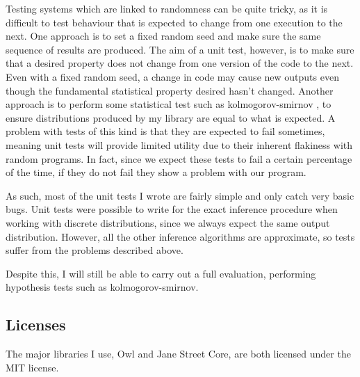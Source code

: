 Testing systems which are linked to randomness can be quite tricky, as it is difficult to test behaviour that is expected to change from one execution to the next. One approach is to set a fixed random seed and make sure the same sequence of results are produced. The aim of a unit test, however, is to make sure that a desired property does not change from one version of the code to the next. Even with a fixed random seed, a change in code may cause new outputs even though the fundamental statistical property desired hasn't changed. Another approach is to perform some statistical test such as kolmogorov-smirnov \cite{}, to ensure distributions produced by my library are equal to what is expected. A problem with tests of this kind is that they are expected to fail sometimes, meaning unit tests will provide limited utility due to their inherent flakiness with random programs. In fact, since we expect these tests to fail a certain percentage of the time, if they do not fail they show a problem with our program.

As such, most of the unit tests I wrote are fairly simple and only catch very basic bugs. Unit tests were possible to write for the exact inference procedure when working with discrete distributions, since we always expect the same output distribution. However, all the other inference algorithms are approximate, so tests suffer from the problems described above.

Despite this, I will still be able to carry out a full evaluation, performing hypothesis tests such as kolmogorov-smirnov.


\subsection{Licenses}

The major libraries I use, Owl and Jane Street Core, are both licensed under the MIT license.

